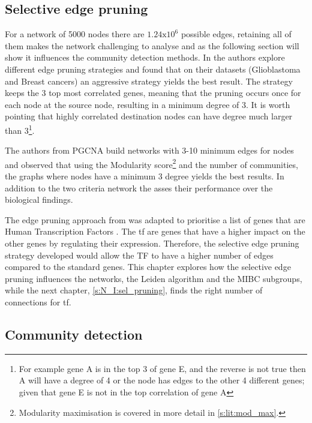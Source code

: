 \subsection{Selective edge pruning} \label{s:N_I:methods_edge_pruning}

For a network of 5000 nodes there are $1.24\text{x}10^6$ possible edges, retaining all of them makes the network challenging to analyse and as the following section will show it influences the community detection methods. In \citet{Care2019-ij} the authors explore different edge pruning strategies and found that on their datasets (Glioblastoma and Breast cancers) an aggressive strategy yields the best result. The strategy keeps the 3 top most correlated genes, meaning that the pruning occurs once for each node at the source node, resulting in a minimum degree of 3. It is worth pointing that highly correlated destination nodes can have degree much larger than 3\footnote{For example gene A is in the top 3 of gene E, and the reverse is not true then A will have a degree of 4 or the node has edges to the other 4 different genes; given that gene E is not in the top correlation of gene A}. 

The authors from PGCNA build networks with 3-10 minimum edges for nodes and observed that using the Modularity score\footnote{Modularity maximisation is covered in more detail in \cref{s:lit:mod_max}.} and the number of communities, the graphs where nodes have a minimum 3 degree yields the best results. In addition to the two criteria network the \citet{Care2019-ij} asses their performance over the biological findings.

The edge pruning approach from \citet{Care2019-ij} was adapted to prioritise a list of genes that are Human Transcription Factors \citet{Lambert2018-el}. The \acrlong{tf} are genes that have a higher impact on the other genes by regulating their expression. Therefore, the selective edge pruning strategy developed would allow the TF to have a higher number of edges compared to the standard genes. This chapter explores how the selective edge pruning influences the networks, the Leiden algorithm and the MIBC subgroups, while the next chapter, \cref{s:N_I:sel_pruning}, finds the right number of connections for \acrshort{tf}.

\subsection{Community detection} \label{s:N_I:methods_comm_detection}


